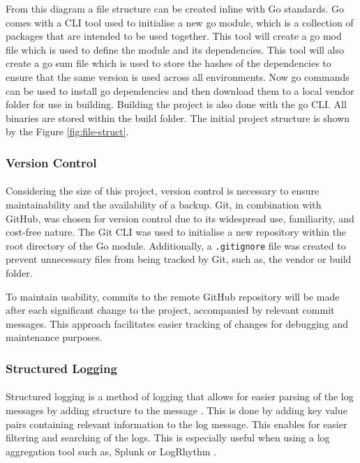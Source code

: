 \documentclass[12pt, conference, final, a4paper, onecolumn, compsoc]{IEEEtran}
\begin{document}
From this diagram a file structure can be created inline with Go standards. Go
comes with a CLI tool used to initialise a new go module, which is a collection
of packages that are intended to be used together. This tool will create a go
mod file which is used to define the module and its dependencies. This tool will
also create a go sum file which is used to store the hashes of the dependencies
to ensure that the same version is used across all environments. Now go commands
can be used to install go dependencies and then download them to a local vendor
folder for use in building. Building the project is also done with the go CLI.
All binaries are stored within the build folder. The initial project structure
is shown by the Figure \ref{fig:file-struct}.

\subsubsection*{Version Control}
\paragraph{}

Considering the size of this project, version control is necessary to ensure
maintainability and the availability of a backup. Git, in combination with
GitHub, was chosen for version control due to its widespread use, familiarity,
and cost-free nature. The Git CLI was used to initialise a new repository within
the root directory of the Go module. Additionally, a \texttt{.gitignore} file
was created to prevent unnecessary files from being tracked by Git, such as, the
vendor or build folder.

To maintain usability, commits to the remote GitHub repository will be made
after each significant change to the project, accompanied by relevant commit
messages. This approach facilitates easier tracking of changes for debugging and
maintenance purposes.

\subsubsection*{Structured Logging}
\paragraph{}

Structured logging is a method of logging that allows for easier parsing of the
log messages by adding structure to the message \citep{struct-log}. This is done by adding key
value pairs containing relevant information to the log message. This enables for
easier filtering and searching of the logs. This is especially useful when using
a log aggregation tool such as, Splunk or LogRhythm \citep{struct-log}.
\end{document}
